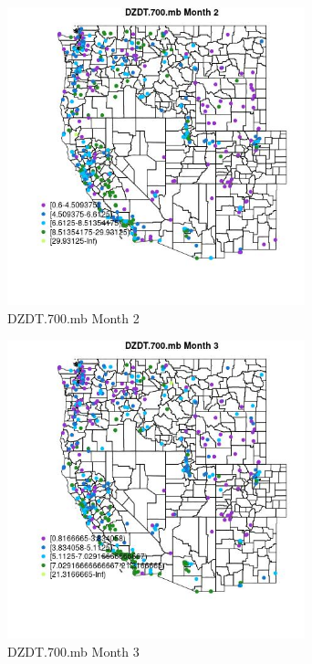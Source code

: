 \begin{figure} 
\centering  
\includegraphics[width=0.77\textwidth]{Code_Outputs/ML_input_report_ML_input_PM25_Step5_part_d_de_duplicated_aves_ML_input_MapObsMo2DZDT700mb.jpg} 
\caption{\label{fig:ML_input_report_ML_input_PM25_Step5_part_d_de_duplicated_aves_ML_inputMapObsMo2DZDT700mb}DZDT.700.mb Month 2} 
\end{figure} 
 

\begin{figure} 
\centering  
\includegraphics[width=0.77\textwidth]{Code_Outputs/ML_input_report_ML_input_PM25_Step5_part_d_de_duplicated_aves_ML_input_MapObsMo3DZDT700mb.jpg} 
\caption{\label{fig:ML_input_report_ML_input_PM25_Step5_part_d_de_duplicated_aves_ML_inputMapObsMo3DZDT700mb}DZDT.700.mb Month 3} 
\end{figure} 
 

